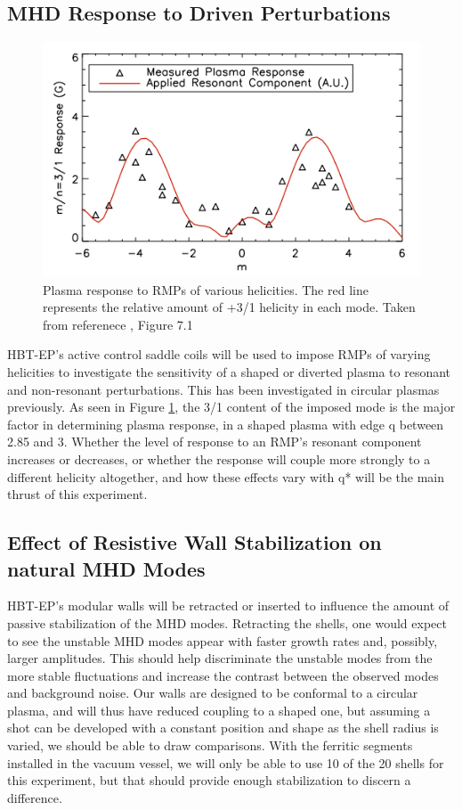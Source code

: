 \documentclass[aps,prl,twocolumn,superscriptaddress,groupedaddress]{revtex4}  %
\begin{document}
	\subsection{MHD Response to Driven Perturbations}
\begin{figure}[b]
	\centering
\includegraphics[scale=.525]{../Plots/Shiraki_thesis_Fig_7_1.png}\caption{Plasma response to RMPs of various helicities.  The red line represents the relative amount of +3/1 helicity in each mode.  Taken from referenece \cite{Shiraki}, Figure 7.1}
	\label{Shiraki_plot}
	\end{figure}
HBT-EP's active control saddle coils will be used to impose RMPs of varying helicities to investigate the sensitivity of a shaped or diverted plasma to resonant and non-resonant perturbations.  This has been investigated in circular plasmas previously\cite{Shiraki}.  As seen in Figure \ref{Shiraki_plot}, the 3/1 content of the imposed mode is the major factor in determining plasma response, in a shaped plasma with edge q between 2.85 and 3.  Whether the level of response to an RMP's resonant component increases or decreases, or whether the response will couple more strongly to a different helicity altogether, and how these effects vary with q* will be the main thrust of this experiment.\par
	\subsection{Effect of Resistive Wall Stabilization on natural MHD Modes}	 
HBT-EP's modular walls will be retracted or inserted to influence the amount of passive stabilization of the MHD modes.  Retracting the shells, one would expect to see the unstable MHD modes appear with faster growth rates and, possibly, larger amplitudes\cite{Shiraki}.  This should help discriminate the unstable modes from the more stable fluctuations and increase the contrast between the observed modes and background noise.  Our walls are designed to be conformal to a circular plasma, and will thus have reduced coupling to a shaped one, but assuming a shot can be developed with a constant position and shape as the shell radius is varied, we should be able to draw comparisons.  With the ferritic segments installed in the vacuum vessel, we will only be able to use 10 of the 20 shells for this experiment, but that should provide enough stabilization to discern a difference.\par
\end{document}
